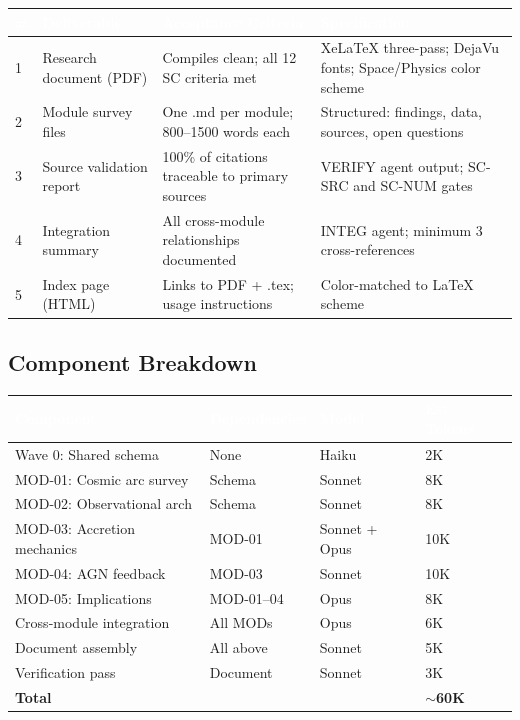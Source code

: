 \documentclass[11pt,letterpaper]{article}
\newcommand{\tableheader}[1]{\textbf{\sffamily\textcolor{white}{#1}}}
\begin{document}
\begin{center}
\begin{tabularx}{\textwidth}{C{0.5cm}L{4cm}L{4cm}X}
\toprule
{}
\tableheader{\#} & \tableheader{Deliverable} & \tableheader{Acceptance Criteria} & \tableheader{Specification} \\
 & Research document (PDF) & Compiles clean; all 12 SC criteria met & XeLaTeX three-pass; DejaVu fonts; Space/Physics color scheme \\
2 & Module survey files & One .md per module; 800--1500 words each & Structured: findings, data, sources, open questions \\
3 & Source validation report & 100\% of citations traceable to primary sources & VERIFY agent output; SC-SRC and SC-NUM gates \\
4 & Integration summary & All cross-module relationships documented & INTEG agent; minimum 3 cross-references \\
5 & Index page (HTML) & Links to PDF + .tex; usage instructions & Color-matched to LaTeX scheme \\
\bottomrule
\end{tabularx}
\end{center}

\subsection{Component Breakdown}

\begin{center}
\begin{tabularx}{\textwidth}{L{3.5cm}L{3cm}C{2cm}C{2cm}}
\toprule
{}
\tableheader{Component} & \tableheader{Dependencies} & \tableheader{Model} & \tableheader{Est. Tokens} \\
\midrule
Wave 0: Shared schema & None & Haiku & 2K \\
MOD-01: Cosmic arc survey & Schema & Sonnet & 8K \\
MOD-02: Observational arch & Schema & Sonnet & 8K \\
MOD-03: Accretion mechanics & MOD-01 & Sonnet + Opus & 10K \\
MOD-04: AGN feedback & MOD-03 & Sonnet & 10K \\
MOD-05: Implications & MOD-01--04 & Opus & 8K \\
Cross-module integration & All MODs & Opus & 6K \\
Document assembly & All above & Sonnet & 5K \\
Verification pass & Document & Sonnet & 3K \\
\midrule
\textbf{Total} & & & \textbf{$\sim$60K} \\
\bottomrule
\end{tabularx}
\end{center}
\end{document}
